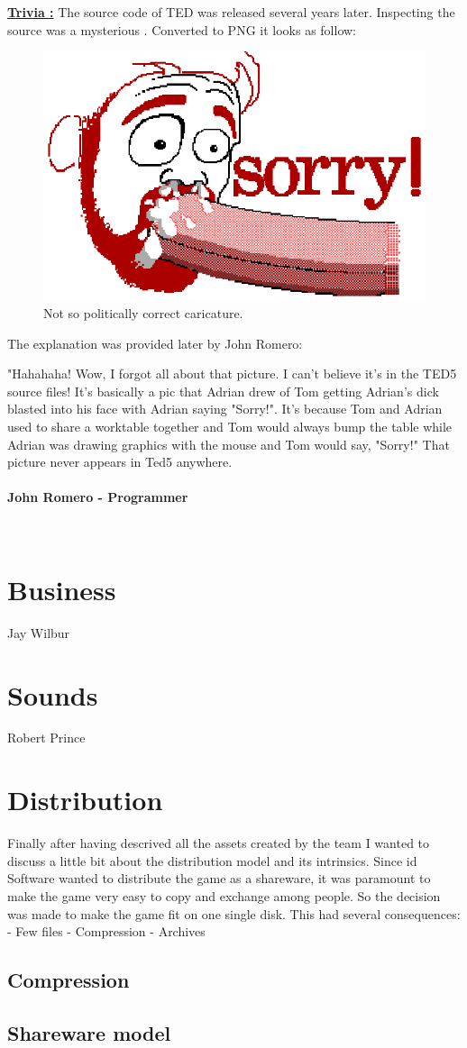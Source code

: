 \documentclass[book.tex]{subfiles}
\begin{document}
 \textbf{\underline{Trivia :}} The source code of TED was released several years later. Inspecting the source was a mysterious . Converted to PNG it looks as follow:\\
\begin{figure}[H]
\centering
 \includegraphics[scale=1.5]{imgs/_tom.eps}
 \caption{Not so politically correct caricature.} \label{fig:mips}
 \end{figure}
The explanation was provided later by John Romero:\\
 \begin{fancyquotes}
   "Hahahaha! Wow, I forgot all about that picture. I can't believe it's 
in the TED5 source files! It's basically a pic that Adrian drew of Tom 
getting Adrian's dick blasted into his face with Adrian saying "Sorry!". 
It's because Tom and Adrian used to share a worktable together and Tom 
would always bump the table while Adrian was drawing graphics with the 
mouse and Tom would say, "Sorry!" That picture never appears in Ted5 
anywhere.\\
   \\
\textbf{John Romero - Programmer}
 \end{fancyquotes}\\



\section{Business}
Jay Wilbur
\section{Sounds}
Robert Prince
\section{Distribution}
Finally after having descrived all the assets created by the team I wanted to discuss a little bit about the distribution model and its intrinsics. Since id Software wanted to distribute the game as a shareware, it was paramount to make the game very easy to copy and exchange among people. So the decision was made to make the game fit on one single disk. This had several consequences:
- Few files
- Compression
- Archives
	\subsection{Compression}
	\subsection{Shareware model}
\end{document}
